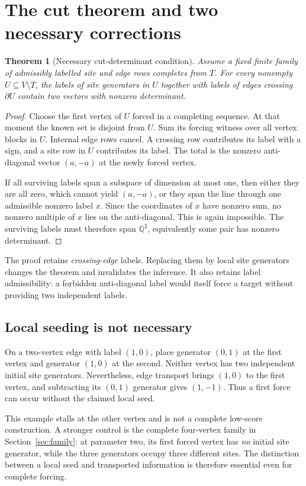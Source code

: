 \documentclass[11pt,letterpaper]{article}
\newtheorem{theorem}{Theorem}[section]
\theoremstyle{definition}
\theoremstyle{remark}\newtheorem{remark}[theorem]{Remark}
\newcommand{\Q}{\mathbb Q}\newcommand{\Z}{\mathbb Z}\newcommand{\R}{\mathbb R}
\begin{document}
\section{The cut theorem and two necessary corrections}
\begin{theorem}[Necessary cut-determinant condition]\label{thm:cut}
Assume a fixed finite family of admissibly labelled site and edge rows completes from $T$. For every nonempty $U\subseteq V\setminus T$, the labels of site generators in $U$ together with labels of edges crossing $\partial U$ contain two vectors with nonzero determinant.
\end{theorem}
\begin{proof}
Choose the first vertex of $U$ forced in a completing sequence. At that moment the known set is disjoint from $U$. Sum its forcing witness over all vertex blocks in $U$. Internal edge rows cancel. A crossing row contributes its label with a sign, and a site row in $U$ contributes its label. The total is the nonzero anti-diagonal vector $(a,-a)$ at the newly forced vertex.

If all surviving labels span a subspace of dimension at most one, then either they are all zero, which cannot yield $(a,-a)$, or they span the line through one admissible nonzero label $x$. Since the coordinates of $x$ have nonzero sum, no nonzero multiple of $x$ lies on the anti-diagonal. This is again impossible. The surviving labels must therefore span $\Q^2$, equivalently some pair has nonzero determinant.
\end{proof}
The proof retains \emph{crossing-edge} labels. Replacing them by local site generators changes the theorem and invalidates the inference. It also retains label admissibility: a forbidden anti-diagonal label would itself force a target without providing two independent labels.

\subsection{Local seeding is not necessary}
On a two-vertex edge with label $(1,0)$, place generator $(0,1)$ at the first vertex and generator $(1,0)$ at the second. Neither vertex has two independent initial site generators. Nevertheless, edge transport brings $(1,0)$ to the first vertex, and subtracting its $(0,1)$ generator gives $(1,-1)$. Thus a first force can occur without the claimed local seed.

This example stalls at the other vertex and is not a complete low-score construction. A stronger control is the complete four-vertex family in Section~\ref{sec:family}: at parameter two, its first forced vertex has \emph{no} initial site generator, while the three generators occupy three different sites. The distinction between a local seed and transported information is therefore essential even for complete forcing.
\end{document}
